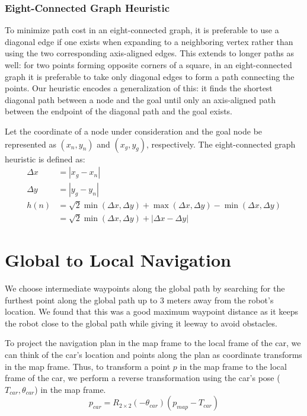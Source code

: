 \documentclass[11pt]{article}
\begin{document}
\subsubsection{Eight-Connected Graph Heuristic}
To minimize path cost in an eight-connected graph, it is preferable to use a
diagonal edge if one exists when expanding to a neighboring vertex rather than
using the two corresponding axis-aligned edges. This extends to longer paths as
well: for two points forming opposite corners of a square, in an eight-connected
graph it is preferable to take only diagonal edges to form a path connecting the
points. Our heuristic encodes a generalization of this: it finds the
shortest diagonal path between a node and the goal until only an axis-aligned
path between the endpoint of the diagonal path and the goal exists.

Let the coordinate of a node under consideration and the goal node be
represented as $(x_n, y_n)$ and $(x_g, y_g)$, respectively. The eight-connected
graph heuristic is defined as:
\begin{align*}
    \Delta x &= |x_g - x_n| \\
    \Delta y &= |y_g - y_n| \\
    h(n) &= \sqrt{2}\min(\Delta x, \Delta y) + \max(\Delta x, \Delta y) - \min(\Delta x, \Delta y) \\
    &= \sqrt{2}\min(\Delta x, \Delta y) + |\Delta x - \Delta y|
\end{align*}

\section{Global to Local Navigation}

We choose intermediate waypoints along the global path by searching for the
furthest point along the global path up to 3 meters away from the robot's
location. We found that this was a good maximum waypoint distance as it keeps
the robot close to the global path while giving it leeway to avoid obstacles.

\bigskip
\noindent
To project the navigation plan in the map frame to the local frame of the car,
we can think of the car's location and points along the plan as coordinate
transforms in the map frame. Thus, to transform a point $p$ in the map frame to
the local frame of the car, we perform a reverse transformation using the
car's pose ($T_{car}, \theta_{car}$) in the map frame.
$$ p_{car} = R_{2 \times 2}(-\theta_{car})(p_{map} - T_{car})$$
\end{document}
